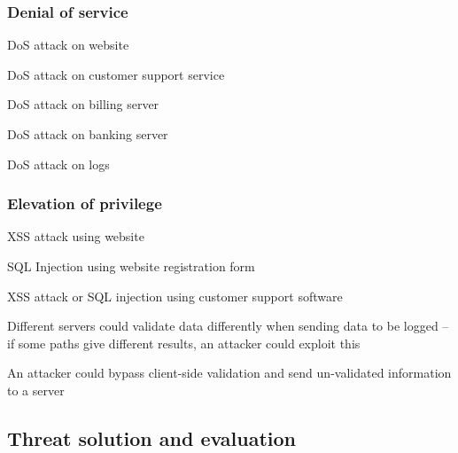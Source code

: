 \subsubsection{Denial of service}

\begin{numbered}[resume]
    \item \label{dosWebsite} DoS attack on website
    \item \label{dosCustomerSupport} DoS attack on customer support service
    \item \label{dosBillingServer} DoS attack on billing server
    \item \label{dosBankingServer} DoS attack on banking server
    \item \label{dosLogs} DoS attack on logs
\end{numbered}

\subsubsection{Elevation of privilege}

\begin{numbered}[resume]
    \item \label{eopXss} XSS attack using website
    \item \label{eopSqlInjection} SQL Injection using website registration form
    \item \label{eopCustomerSupport} XSS attack or SQL injection using customer support software
    \item \label{eopValidationDifference} Different servers could validate data differently when sending data to be logged – if some paths give different results, an attacker could exploit this
    \item \label{eopClientSideValidation} An attacker could bypass client-side validation and send un-validated information to a server
\end{numbered}

\subsection{Threat solution and evaluation}

